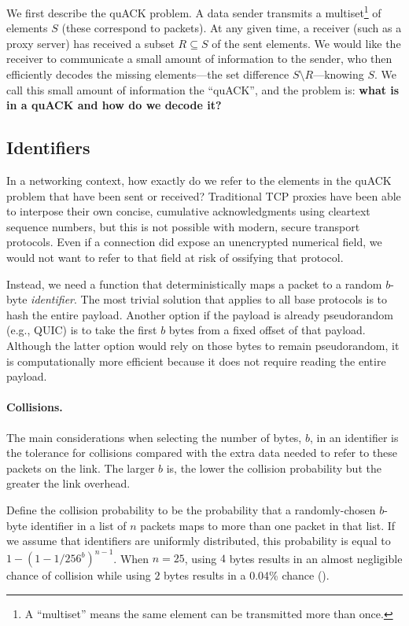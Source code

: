 We first describe the quACK problem. A data sender transmits a multiset\footnote
{A ``multiset'' means the same element can be transmitted more than once.} of
elements $S$ (these correspond to packets). At any given time, a receiver
(such as a proxy server) has received a subset $R \subseteq S$ of the sent
elements. We would like the receiver to communicate a small amount of
information to the sender, who then efficiently decodes the missing
elements---the set difference $S \setminus R$---knowing $S$. We call this small
amount of information the ``quACK'', and the problem is:
\textbf{what is in a quACK and how do we decode it?}

\subsection{Identifiers}
\label{sec:quack:problem:identifiers}

In a networking context, how exactly do we refer to the elements
in the quACK problem that have been sent or received?
Traditional TCP proxies have been able to interpose their
own concise, cumulative acknowledgments using cleartext sequence numbers, but
this is not possible with modern, secure transport protocols. Even if a
connection did expose an unencrypted numerical field, we would not want to
refer to that field at risk of ossifying that protocol.

Instead, we need a function that deterministically maps
a packet to a random $b$-byte \emph{identifier}. The most trivial solution
that applies to all base protocols is
to hash the entire payload. Another option if the payload is already
pseudorandom (e.g., QUIC) is to take the first $b$ bytes from a fixed
offset of that payload. Although the latter option would rely on those bytes
to remain pseudorandom, it is computationally more efficient because it
does not require reading the entire payload.

\paragraph{Collisions.}
The main considerations when selecting the number of bytes, $b$, in an
identifier is the tolerance for collisions compared with the extra data
needed to refer to these packets on the link. The larger $b$ is, the lower
the collision probability but the greater the link overhead.

Define the collision probability to be the probability that a randomly-chosen
$b$-byte identifier in a list of $n$ packets maps to more than one packet in
that list.
If we assume that identifiers are uniformly distributed,
this probability is equal to $1-(1 - 1/256^{b})^{n-1}$.
When $n=25$, using $4$ bytes results in an almost negligible chance of
collision while using $2$ bytes results in a 0.04\% chance
().


